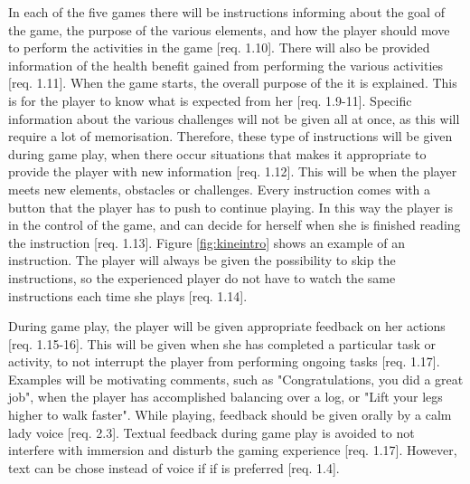 In each of the five games there will be instructions informing about the goal of the game, the purpose of the various elements, and how the player should move to perform the activities in the game [req. 1.10]. There will also be provided information of the health benefit gained from performing the various activities [req. 1.11]. When the game starts, the overall purpose of the it is explained. This is for the player to know what is expected from her [req. 1.9-11]. Specific information about the various challenges will not be given all at once, as this will require a lot of memorisation. Therefore, these type of instructions will be given during game play, when there occur situations that makes it appropriate to provide the player with new information [req. 1.12]. This will be when the player meets new elements, obstacles or challenges. Every instruction comes with a button that the player has to push to continue playing. In this way the player is in the control of the game, and can decide for herself when she is finished reading the instruction [req. 1.13]. Figure \ref{fig:kineintro} shows an example of an instruction. The player will always be given the possibility to skip the instructions, so the experienced player do not have to watch the same instructions each time she plays [req. 1.14].

During game play, the player will be given appropriate feedback on her actions [req. 1.15-16]. This will be given when she has completed a particular task or activity, to not interrupt the player from performing ongoing tasks [req. 1.17]. Examples will be motivating comments, such as "Congratulations, you did a great job", when the player has accomplished balancing over a log, or "Lift your legs higher to walk faster". While playing, feedback should be given orally by a calm lady voice [req. 2.3]. Textual feedback during game play is avoided to not interfere with immersion and disturb the gaming experience [req. 1.17].  However, text can be chose instead of voice if if is preferred [req. 1.4]. 

